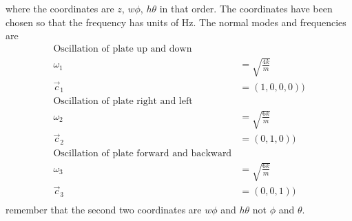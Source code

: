 \documentclass[10pt]{article}
\begin{document}
where the coordinates are $z$, $w\phi$, $h\theta$ in that order.  The coordinates
have been chosen so that the frequency has units of Hz.  The normal modes and
frequencies are
\begin{align*}
  \textrm{Oscillation\ of\ plate\ up\ and\ down}\\
  \omega_1 &= \sqrt{\frac{4k}{m}}\\
  \vec{c}_1 &= (1,0,0,0))\\
  \textrm{Oscillation\ of\ plate\ right\ and\ left}\\
  \omega_2 &= \sqrt{\frac{6k}{m}}\\
  \vec{c}_2 &= (0,1,0))\\
  \textrm{Oscillation\ of\ plate\ forward\ and\ backward}\\
  \omega_3 &= \sqrt{\frac{6k}{m}}\\
  \vec{c}_3 &= (0,0,1))\\
\end{align*}
remember that the second two coordinates are $w\phi$ and $h\theta$ not
$\phi$ and $\theta$.
\end{document}
